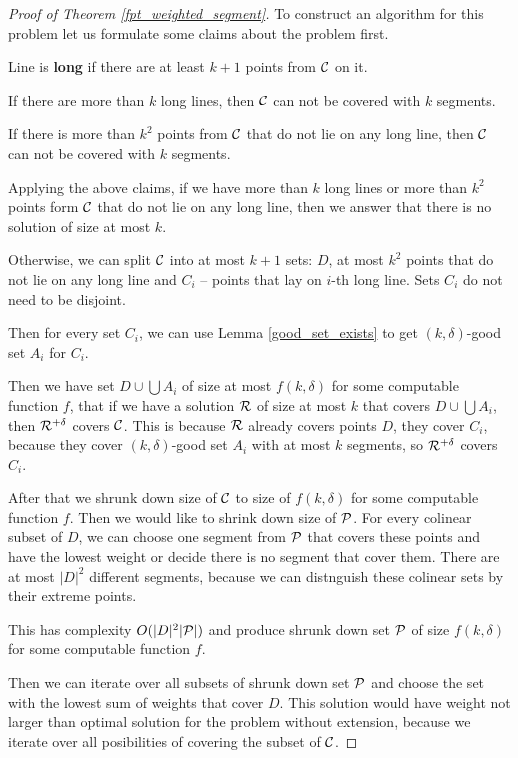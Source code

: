 \begin{proof}[Proof of Theorem \ref{fpt_weighted_segment}]

To construct an algorithm for this problem let us formulate
some claims about the problem first.

\begin{defi}
Line is \textbf{long} if there are at least $k+1$ points from $\mathcal{C}$ on it.
\end{defi}

\begin{claim}
If there are more than $k$ long lines, then 
$\mathcal{C}$ can not be covered with $k$ segments.
\end{claim}

\begin{claim}
If there is more than $k^2$ points from $\mathcal{C}$
that do not lie on any long line, then $\mathcal{C}$ can not be covered with $k$ segments.
\end{claim}

Applying the above claims, if we have more than $k$ long lines
or more than $k^2$ points form $\mathcal{C}$
that do not lie on any long line, then we answer that
there is no solution of size at most $k$.

Otherwise, we can split $\mathcal{C}$ into at most $k+1$ sets:
$D$, at most $k^2$ points that do not lie on any long line
and $C_i$ -- points
that lay on $i$-th long line.
Sets $C_i$ do not need to be disjoint.

Then for every set $C_i$, we can use Lemma \ref{good_set_exists}
to get $(k,\delta)$-good set $A_i$
for $C_i$.

Then we have set $D \cup \bigcup A_i$ of size at most $f(k, \delta)$
for some computable function $f$, that if we have a solution $\mathcal{R}$ of size at most $k$
that covers $D \cup \bigcup A_i$, then $\mathcal{R}^{+\delta}$ covers $\mathcal{C}$.
This is because
$\mathcal{R}$ already covers points $D$, they cover $C_i$, because
they cover $(k,\delta)$-good set $A_i$ with at most $k$ segments,
so $\mathcal{R}^{+\delta}$ covers $C_i$.

After that we shrunk down size of $\mathcal{C}$ to size of $f(k, \delta)$
for some computable function $f$.
Then we would like to shrink down size of $\mathcal{P}$.
For every colinear subset of $D$, we can choose one segment from
$\mathcal{P}$ that covers these points and have the lowest weight
or decide there is no segment that cover them.
There are at most $|D|^2$ different segments, because
we can distnguish these colinear sets by their extreme points.

This has complexity $O(|D|^2|\mathcal{P}|)$ and produce shrunk down
set $\mathcal{P}$ of size $f(k, \delta)$ for some computable function $f$.

Then we can iterate over all subsets of shrunk down set $\mathcal{P}$ and
choose the set with the lowest sum of weights that cover $D$. This solution
would have weight not larger than optimal solution
for the problem without extension, because we iterate
over all posibilities of covering the subset of $\mathcal{C}$.

\end{proof}

